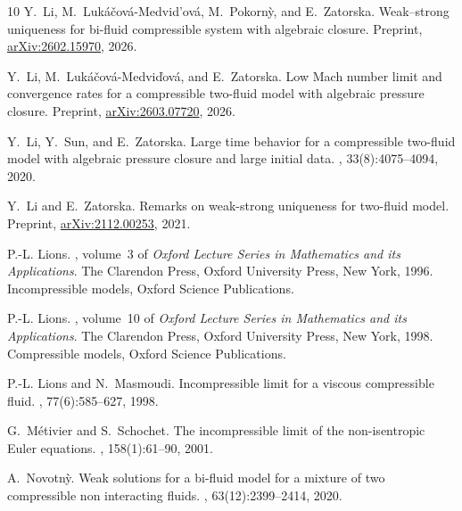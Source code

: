 \documentclass[11pt, twoside, a4paper]{article}
\theoremstyle{plain}
\theoremstyle{remark}
\numberwithin{equation}{section}
\begin{document}
\begin{thebibliography}{10}
Y.~Li, M.~Luk{\'a}{\v{c}}ov{\'a}-Medvid'ov{\'a}, M.~Pokorn{\`y}, and
  E.~Zatorska.
\newblock Weak--strong uniqueness for bi-fluid compressible system with
  algebraic closure.
\newblock Preprint, \href{https://arxiv.org/abs/2602.15970}{arXiv:2602.15970},
  2026.

Y.~Li, M.~Lukáčová-Medviďová, and E.~Zatorska.
\newblock Low {M}ach number limit and convergence rates for a compressible
  two-fluid model with algebraic pressure closure.
\newblock Preprint, \href{https://arxiv.org/abs/2603.07720}{arXiv:2603.07720},
  2026.

Y.~Li, Y.~Sun, and E.~Zatorska.
\newblock Large time behavior for a compressible two-fluid model with algebraic
  pressure closure and large initial data.
, 33(8):4075--4094, 2020.

Y.~Li and E.~Zatorska.
\newblock Remarks on weak-strong uniqueness for two-fluid model.
\newblock Preprint, \href{https://arxiv.org/abs/2112.00253}{arXiv:2112.00253},
  2021.

P.-L. Lions.
, volume~3 of
  {\em Oxford Lecture Series in Mathematics and its Applications}.
\newblock The Clarendon Press, Oxford University Press, New York, 1996.
\newblock Incompressible models, Oxford Science Publications.

P.-L. Lions.
, volume~10 of
  {\em Oxford Lecture Series in Mathematics and its Applications}.
\newblock The Clarendon Press, Oxford University Press, New York, 1998.
\newblock Compressible models, Oxford Science Publications.

P.-L. Lions and N.~Masmoudi.
\newblock Incompressible limit for a viscous compressible fluid.
, 77(6):585--627, 1998.

G.~M{\'e}tivier and S.~Schochet.
\newblock The incompressible limit of the non-isentropic {E}uler equations.
, 158(1):61--90, 2001.

A.~Novotn{\`y}.
\newblock Weak solutions for a bi-fluid model for a mixture of two compressible
  non interacting fluids.
, 63(12):2399--2414, 2020.


\end{thebibliography}
\end{document}
